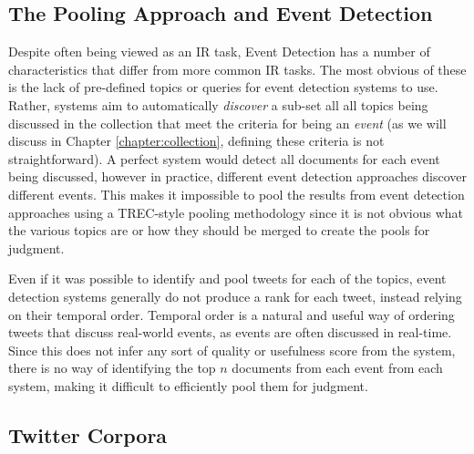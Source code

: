 \subsection{The Pooling Approach and Event Detection}
Despite often being viewed as an IR task, Event Detection has a number of characteristics that differ from more common IR tasks.
The most obvious of these is the lack of pre-defined topics or queries for event detection systems to use.
Rather, systems aim to automatically \emph{discover} a sub-set all all topics being discussed in the collection that meet the criteria for being an \emph{event} (as we will discuss in Chapter \ref{chapter:collection}, defining these criteria is not straightforward).
A perfect system would detect all documents for each event being discussed, however in practice, different event detection approaches discover different events.
This makes it impossible to pool the results from event detection approaches using a TREC-style pooling methodology since it is not obvious what the various topics are or how they should be merged to create the pools for judgment.

Even if it was possible to identify and pool tweets for each of the topics, event detection systems generally do not produce a rank for each tweet, instead relying on their temporal order.
Temporal order is a natural and useful way of ordering tweets that discuss real-world events, as events are often discussed in real-time.
Since this does not infer any sort of quality or usefulness score from the system, there is no way of identifying the top $n$ documents from each event from each system, making it difficult to efficiently pool them for judgment.

\subsection{Twitter Corpora}
\label{background:sec:twittercorpora}

